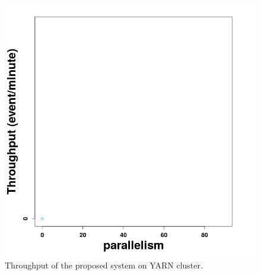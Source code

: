 



\begin{figure}[H]
	
	\includegraphics[width=\textwidth,height=.62\textheight]{chapters/figures/throughput/throughput.png}
	
	\caption{Throughput of the proposed system on YARN cluster.}
	\label{fig:throughput}
\end{figure}
 



















